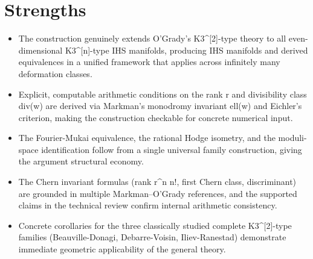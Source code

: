 \documentclass[11pt]{article}
\begin{document}
\section*{Strengths}
\begin{itemize}[leftmargin=*]
  \item The construction genuinely extends O'Grady's K3\^{}[2]-type theory to all even-dimensional K3\^{}[n]-type IHS manifolds, producing IHS manifolds and derived equivalences in a unified framework that applies across infinitely many deformation classes.
  \item Explicit, computable arithmetic conditions on the rank r and divisibility class div(w) are derived via Markman's monodromy invariant ell(w) and Eichler's criterion, making the construction checkable for concrete numerical input.
  \item The Fourier-Mukai equivalence, the rational Hodge isometry, and the moduli-space identification follow from a single universal family construction, giving the argument structural economy.
  \item The Chern invariant formulas (rank r\^{}n n!, first Chern class, discriminant) are grounded in multiple Markman--O'Grady references, and the supported claims in the technical review confirm internal arithmetic consistency.
  \item Concrete corollaries for the three classically studied complete K3\^{}[2]-type families (Beauville-Donagi, Debarre-Voisin, Iliev-Ranestad) demonstrate immediate geometric applicability of the general theory.
\end{itemize}
\end{document}
